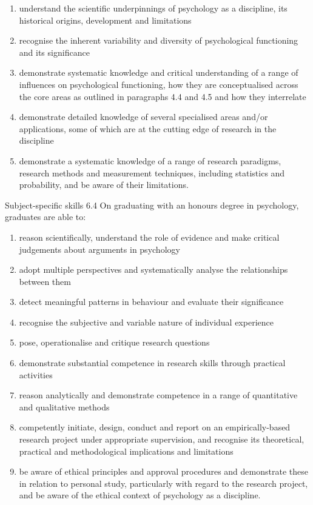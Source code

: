 \documentclass[
  11pt,
  letterpaper,
  oneside,
  open=any]{scrbook}
\begin{document}
\begin{enumerate}
\def\labelenumi{\arabic{enumi}.}
\item
  understand the scientific underpinnings of psychology as a discipline,
  its historical origins, development and limitations
\item
  recognise the inherent variability and diversity of psychological
  functioning and its significance
\item
  demonstrate systematic knowledge and critical understanding of a range
  of influences on psychological functioning, how they are
  conceptualised across the core areas as outlined in paragraphs 4.4 and
  4.5 and how they interrelate
\item
  demonstrate detailed knowledge of several specialised areas and/or
  applications, some of which are at the cutting edge of research in the
  discipline
\item
  demonstrate a systematic knowledge of a range of research paradigms,
  research methods and measurement techniques, including statistics and
  probability, and be aware of their limitations.
\end{enumerate}

Subject-specific skills 6.4 On graduating with an honours degree in
psychology, graduates are able to:

\begin{enumerate}
\def\labelenumi{\arabic{enumi}.}
\item
  reason scientifically, understand the role of evidence and make
  critical judgements about arguments in psychology
\item
  adopt multiple perspectives and systematically analyse the
  relationships between them
\item
  detect meaningful patterns in behaviour and evaluate their
  significance
\item
  recognise the subjective and variable nature of individual experience
\item
  pose, operationalise and critique research questions
\item
  demonstrate substantial competence in research skills through
  practical activities
\item
  reason analytically and demonstrate competence in a range of
  quantitative and qualitative methods
\item
  competently initiate, design, conduct and report on an
  empirically-based research project under appropriate supervision, and
  recognise its theoretical, practical and methodological implications
  and limitations
\item
  be aware of ethical principles and approval procedures and demonstrate
  these in relation to personal study, particularly with regard to the
  research project, and be aware of the ethical context of psychology as
  a discipline.
\end{enumerate}
\end{document}
